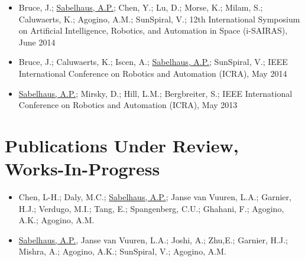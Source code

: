 \documentclass[letterpaper]{deedy-resume} %
\begin{document}
\begin{itemize}
\item {} Bruce, J.; \underline{Sabelhaus, A.P.}; Chen, Y.; Lu, D.; Morse, K.; Milam, S.; Caluwaerts, K.; Agogino, A.M.; SunSpiral, V.; 12th International Symposium on Artificial Intelligence, Robotics, and Automation in Space (i-SAIRAS), June 2014

\item {} Bruce, J.; Caluwaerts, K.; Iscen, A.; \underline{Sabelhaus, A.P.}; SunSpiral, V.; IEEE International Conference on Robotics and Automation (ICRA), May 2014

\item {} \underline{Sabelhaus, A.P.}; Mirsky, D.; Hill, L.M.; Bergbreiter, S.; IEEE International Conference on Robotics and Automation (ICRA), May 2013


\end{itemize}




  
\section{Publications Under Review, Works-In-Progress}

\vspace{0.2cm}

\begin{itemize}

\item {} Chen, L-H.;  Daly, M.C.; \underline{Sabelhaus, A.P.}; Janse van Vuuren, L.A.; Garnier, H.J.; Verdugo, M.I.; Tang, E.; Spangenberg, C.U.; Ghahani, F.; Agogino, A.K.; Agogino, A.M.

\item {} \underline{Sabelhaus, A.P.}, Janse van Vuuren, L.A.; Joshi, A.; Zhu,E.; Garnier, H.J.; Mishra, A.; Agogino, A.K.; SunSpiral, V.; Agogino, A.M.

\end{itemize}
\end{document}
